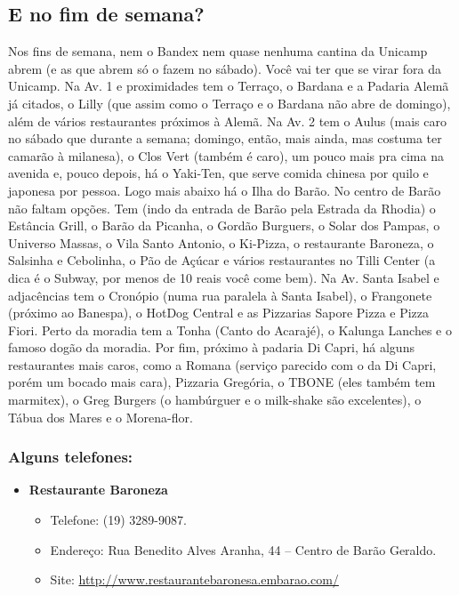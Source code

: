\documentclass[a4paper,10pt, twocolumn]{article}
\begin{document}
\subsection{E no fim de semana?}
Nos fins de semana, nem o Bandex nem quase nenhuma cantina da Unicamp abrem (e
as que abrem só o fazem no sábado). Você vai ter que se virar fora da Unicamp.
Na Av. 1 e proximidades tem o Terraço, o Bardana e a Padaria Alemã já citados,
o Lilly (que assim como o Terraço e o Bardana não abre de domingo), além de
vários restaurantes próximos à Alemã. Na Av. 2 tem o Aulus (mais caro no sábado
que durante a semana; domingo, então, mais ainda, mas costuma ter camarão
à milanesa), o Clos Vert (também é caro), um pouco mais pra cima na avenida e,
pouco depois, há o Yaki-Ten, que serve comida chinesa por quilo e japonesa por
pessoa. Logo mais abaixo há o Ilha do Barão. No centro de Barão não faltam
opções. Tem (indo da entrada de Barão pela Estrada da Rhodia) o Estância Grill,
o Barão da Picanha, o Gordão Burguers, o Solar dos Pampas, o Universo Massas,
o Vila Santo Antonio, o Ki-Pizza, o restaurante Baroneza, o Salsinha
e Cebolinha, o Pão de Açúcar e vários restaurantes no Tilli Center (a dica
é o Subway, por menos de 10 reais você come bem). Na Av. Santa Isabel
e adjacências tem o Cronópio (numa rua paralela à Santa Isabel), o Frangonete
(próximo ao Banespa), o HotDog Central e as Pizzarias Sapore Pizza e Pizza
Fiori. Perto da moradia tem a Tonha (Canto do Acarajé), o Kalunga Lanches
e o famoso dogão da moradia. Por fim, próximo à padaria Di Capri, há alguns
restaurantes mais caros, como a Romana (serviço parecido com o da Di Capri,
porém um bocado mais cara), Pizzaria Gregória, o TBONE (eles também tem
marmitex), o Greg Burgers (o hambúrguer e o milk-shake são excelentes), o Tábua
dos Mares e o Morena-flor.

\subsubsection{Alguns telefones:}
\begin{itemize}
\item  \textbf{Restaurante Baroneza}
\begin{itemize}
\item  Telefone: (19) 3289-9087.
\item  Endereço: Rua Benedito Alves Aranha, 44 -- Centro de Barão Geraldo.
\item  Site: \url{http://www.restaurantebaronesa.embarao.com/}
\end{itemize}
\end{itemize}
\end{document}
